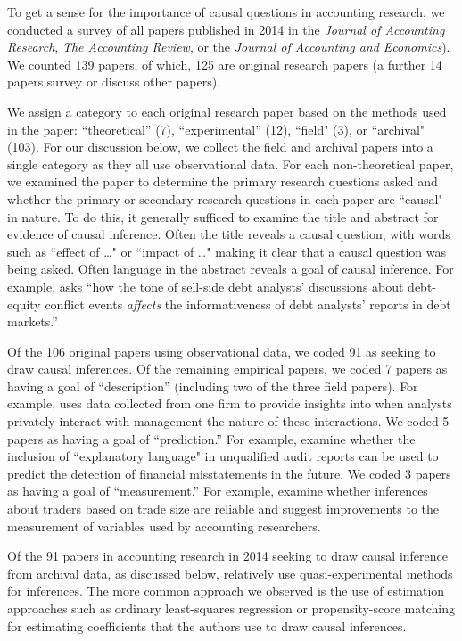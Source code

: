 \documentclass[11pt,reqno]{amsart}
\begin{document}
To get a sense for the importance of causal questions in accounting research,
we conducted a survey of all papers published in 2014 in the  \textit{Journal of Accounting Research}, \textit{The Accounting Review}, or the \textit{Journal of Accounting and Economics}).
We counted 139 papers, of which, 125 are original research papers (a further 14 papers survey or discuss other papers).

We assign a category to each original research paper based on the methods used in the paper: ``theoretical''  (7), ``experimental'' (12), ``field" (3), or ``archival"  (103). 
For our discussion below, we collect the field and archival papers into a single category as they all use observational data.
For each non-theoretical paper, we examined the paper to determine the primary research questions asked and whether the primary or secondary research questions in each paper are
``causal" in nature.
To do this, it generally sufficed to examine the title and abstract for evidence of causal inference. 
Often the title reveals a causal question, with words such as  ``effect of \dots" or ``impact of \dots"  
\citep[e.g.][]{Cohen:2014jl,Clorproell:2014cv} making it clear that a causal question was being asked. 
Often language in the abstract reveals a goal of causal inference. 
For example, \citet{deFranco:2014ct} asks ``how the tone of sell-side debt analysts' discussions about debt-equity conflict events \emph{affects} the informativeness of debt analysts’ reports in debt markets.''

Of the 106 original papers using observational data, we coded 91 as seeking to draw causal inferences.
Of the remaining empirical papers, we coded 7 papers as having a goal of ``description'' (including two of the three field papers). 
For example, \citet{Soltes:2013ba} uses data collected from one firm to provide insights into when analysts privately interact with management the nature of these interactions.
We coded 5 papers as having a goal of ``prediction.'' 
For example, \citet{Czerney:2014bv} examine whether the inclusion of ``explanatory language" in unqualified audit reports can be used to predict the detection of financial misstatements in the future.
We coded 3 papers as having a goal of ``measurement.'' 
For example, \citet{Cready:2014ji} examine whether inferences about traders based on trade size are reliable and suggest improvements to the measurement of variables used by accounting researchers.

Of the 91 papers in accounting research in 2014 seeking to draw causal inference from archival data, as discussed below, relatively use quasi-experimental methods for inferences.
The more common approach we observed is the use of estimation approaches such as ordinary least-squares regression or propensity-score matching for estimating coefficients that the authors use to draw causal inferences.
\end{document}
